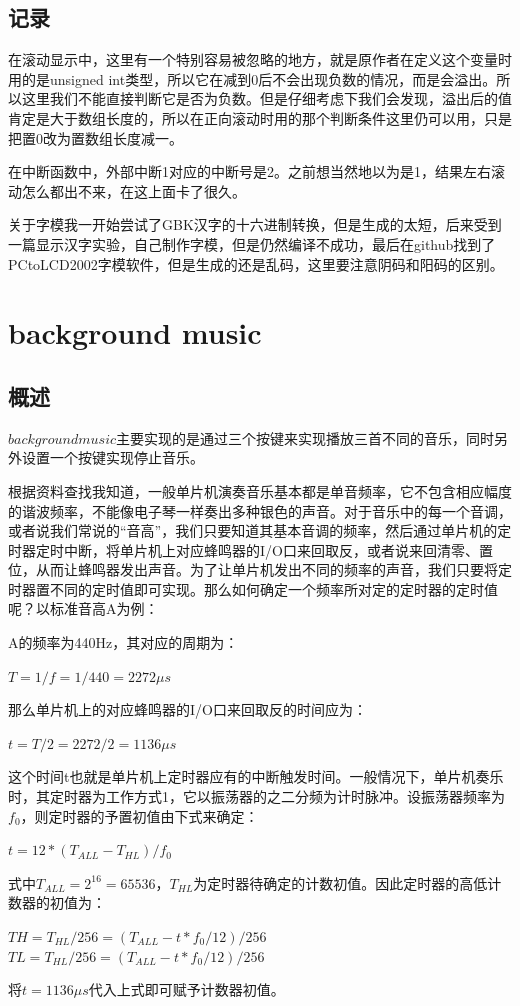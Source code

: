 \documentclass[UTF8]{ctexart}
\begin{document}
\subsection{记录}
在滚动显示中，这里有一个特别容易被忽略的地方，就是原作者在定义这个变量时用的是unsigned int类型，所以它在减到0后不会出现负数的情况，而是会溢出。所以这里我们不能直接判断它是否为负数。但是仔细考虑下我们会发现，溢出后的值肯定是大于数组长度的，所以在正向滚动时用的那个判断条件这里仍可以用，只是把置0改为置数组长度减一。\par
在中断函数中，外部中断1对应的中断号是2。之前想当然地以为是1，结果左右滚动怎么都出不来，在这上面卡了很久。\par
关于字模我一开始尝试了GBK汉字的十六进制转换，但是生成的太短，后来受到一篇显示汉字实验，自己制作字模，但是仍然编译不成功，最后在github找到了PCtoLCD2002字模软件，但是生成的还是乱码，这里要注意阴码和阳码的区别。
    \section{background music}
    \subsection{概述}
    $background music$主要实现的是通过三个按键来实现播放三首不同的音乐，同时另外设置一个按键实现停止音乐。\par
    根据资料查找我知道，一般单片机演奏音乐基本都是单音频率，它不包含相应幅度的谐波频率，不能像电子琴一样奏出多种银色的声音。对于音乐中的每一个音调，或者说我们常说的“音高”，我们只要知道其基本音调的频率，然后通过单片机的定时器定时中断，将单片机上对应蜂鸣器的I/O口来回取反，或者说来回清零、置位，从而让蜂鸣器发出声音。为了让单片机发出不同的频率的声音，我们只要将定时器置不同的定时值即可实现。那么如何确定一个频率所对定的定时器的定时值呢？以标准音高A为例：\par
    A的频率为440Hz，其对应的周期为：
    \begin{center}
    $T=1/f=1/440=2272\mu s$
    \end{center}
    那么单片机上的对应蜂鸣器的I/O口来回取反的时间应为：
    \begin{center}
    $t=T/2=2272/2=1136\mu s$
    \end{center}
    这个时间t也就是单片机上定时器应有的中断触发时间。一般情况下，单片机奏乐时，其定时器为工作方式1，它以振荡器的之二分频为计时脉冲。设振荡器频率为$f_0$，则定时器的予置初值由下式来确定：
    \begin{center}
      $t=12*(T_{ALL}-T_{HL})/f_0$
    \end{center}
    式中$T_{ALL}=2^{16}=65536$，$T_{HL}$为定时器待确定的计数初值。因此定时器的高低计数器的初值为：
    \begin{center}
      $TH=T_{HL}/256=(T_{ALL}-t*f_{0}/12)/256$\\
      $TL=T_{HL}/256=(T_{ALL}-t*f_{0}/12)/256$
    \end{center}
    将$t=1136\mu s$代入上式即可赋予计数器初值。
\end{document}

